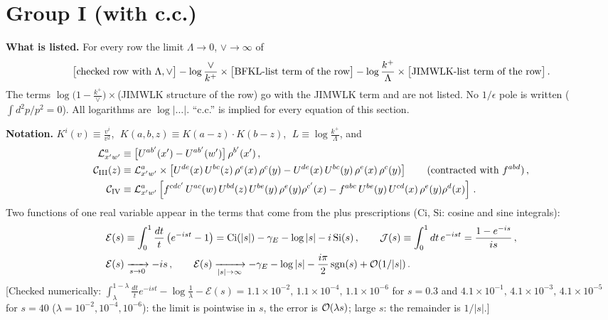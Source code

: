 \documentclass[9pt]{article}
\numberwithin{equation}{section}
\begin{document}

\section{Group I (with c.c.)}
\noindent\textbf{What is listed.} For every row the limit $\Lambda\to0$, $\vee\to\infty$ of
\begin{align}
\big[\text{checked row with }\Lambda,\vee\big]-\log\frac{\vee}{k^{+}}\times\big[\text{BFKL-list term of the row}\big]-\log\frac{k^{+}}{\Lambda}\times\big[\text{JIMWLK-list term of the row}\big]\,.\notag
\end{align}
The terms $\log\big(1-\frac{k^{+}}{\vee}\big)\times$(JIMWLK structure of the row) go with the JIMWLK term and are not listed. No $1/\epsilon$ pole is written ($\int d^{2}p/p^{2}=0$). All logarithms are $\log|\dots|$. ``c.c.'' is implied for every equation of this section.

\noindent\textbf{Notation.} $K^{i}(v)\equiv\frac{v^{i}}{v^{2}}$, $\;K(a,b,z)\equiv K(a-z)\cdot K(b-z)$, $\;L\equiv\log\frac{k^{+}}{\Lambda}$, and
\begin{align}
\mathcal{L}^{a}_{x'w'} &\equiv \big[U^{ab'}(x')-U^{ab'}(w')\big]\,\rho^{b'}(x')\,,\notag\\
\mathcal{C}_{\rm III}(z) &\equiv \mathcal{L}^{a}_{x'w'}\times\left[U^{de}(x)\,U^{bc}(z)\,\rho^{e}(x)\,\rho^{c}(y)-U^{de}(x)\,U^{bc}(y)\,\rho^{e}(x)\,\rho^{c}(y)\right]\qquad(\text{contracted with } f^{abd})\,,\notag\\
\mathcal{C}_{\rm IV} &\equiv \mathcal{L}^{a}_{x'w'}\left[f^{cdc'}\,U^{ac}(w)\,U^{bd}(z)\,U^{be}(y)\,\rho^{e}(y)\rho^{c'}(x)-f^{abc}\,U^{be}(y)\,U^{cd}(x)\,\rho^{e}(y)\rho^{d}(x)\right]\,.\notag
\end{align}
Two functions of one real variable appear in the terms that come from the plus prescriptions ($\mathrm{Ci}$, $\mathrm{Si}$: cosine and sine integrals):
\begin{align}
\mathcal{E}(s)&\equiv\int_{0}^{1}\frac{dt}{t}\,\big(e^{-ist}-1\big)=\mathrm{Ci}(|s|)-\gamma_{E}-\log|s|-i\,\mathrm{Si}(s)\,,\qquad
\mathcal{J}(s)\equiv\int_{0}^{1}dt\,e^{-ist}=\frac{1-e^{-is}}{is}\,,\label{eq:EJ}\\
\mathcal{E}(s)&\xrightarrow[s\to0]{}-is\,,\qquad \mathcal{E}(s)\xrightarrow[|s|\to\infty]{}-\gamma_{E}-\log|s|-\frac{i\pi}{2}\,{\rm sgn}(s)+{\cal O}(1/|s|)\,.\notag
\end{align}
{\color{gray}\small [Checked numerically: $\int_{\lambda}^{1-\lambda}\frac{dt}{t}e^{-ist}-\log\frac1\lambda-\mathcal{E}(s)=1.1\times10^{-2},\,1.1\times10^{-4},\,1.1\times10^{-6}$ for $s=0.3$ and $4.1\times10^{-1},\,4.1\times10^{-3},\,4.1\times10^{-5}$ for $s=40$ ($\lambda=10^{-2},10^{-4},10^{-6}$): the limit is pointwise in $s$, the error is ${\cal O}(\lambda s)$; large $s$: the remainder is $1/|s|$.]}
\end{document}
